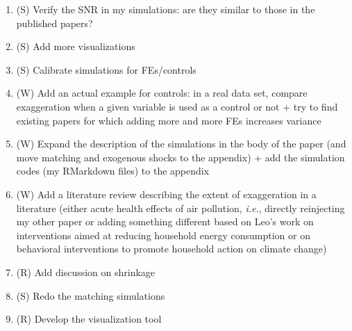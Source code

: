 \documentclass[usletter, 12pt]{article}
\begin{document}
	\begin{enumerate}
		\item (S) Verify the SNR in my simulations: are they similar to those in the published papers?
		\item (S) Add more visualizations
		\item (S) Calibrate simulations for FEs/controls
		\item (W) Add an actual example for controls: in a real data set, compare exaggeration when a given variable is used as a control or not + try to find existing papers for which adding more and more FEs increases variance
		\item (W) Expand the description of the simulations in the body of the paper (and move matching and exogenous shocks to the appendix) + add the simulation codes (my RMarkdown files) to the appendix
		\item (W) Add a literature review describing the extent of exaggeration in a literature (either acute health effects of air pollution, \textit{i.e.}, directly reinjecting my other paper or adding something different  based on Leo's work on interventions aimed at reducing household energy consumption or on behavioral interventions to promote household action on climate change)
		\item (R) Add discussion on shrinkage
		\item (S) Redo the matching simulations
		\item (R) Develop the visualization tool
	\end{enumerate}




		
\end{document}
